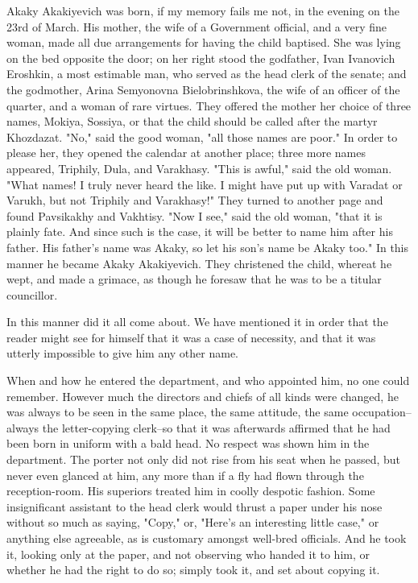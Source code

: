 Akaky Akakiyevich was born, if my memory fails me not, in the evening
on the 23rd of March. His mother, the wife of a Government official,
and a very fine woman, made all due arrangements for having the child
baptised. She was lying on the bed opposite the door; on her right
stood the godfather, Ivan Ivanovich Eroshkin, a most estimable man,
who served as the head clerk of the senate; and the godmother, Arina
Semyonovna Bielobrinshkova, the wife of an officer of the quarter, and
a woman of rare virtues. They offered the mother her choice of three
names, Mokiya, Sossiya, or that the child should be called after the
martyr Khozdazat. "No," said the good woman, "all those names are
poor." In order to please her, they opened the calendar at another
place; three more names appeared, Triphily, Dula, and Varakhasy. "This
is awful," said the old woman. "What names! I truly never heard the
like. I might have put up with Varadat or Varukh, but not Triphily and
Varakhasy!" They turned to another page and found Pavsikakhy and
Vakhtisy. "Now I see," said the old woman, "that it is plainly fate.
And since such is the case, it will be better to name him after his
father. His father's name was Akaky, so let his son's name be Akaky
too." In this manner he became Akaky Akakiyevich. They christened the
child, whereat he wept, and made a grimace, as though he foresaw that
he was to be a titular councillor.

In this manner did it all come about. We have mentioned it in order
that the reader might see for himself that it was a case of necessity,
and that it was utterly impossible to give him any other name.

When and how he entered the department, and who appointed him, no one
could remember. However much the directors and chiefs of all kinds
were changed, he was always to be seen in the same place, the same
attitude, the same occupation--always the letter-copying clerk--so
that it was afterwards affirmed that he had been born in uniform with
a bald head. No respect was shown him in the department. The porter
not only did not rise from his seat when he passed, but never even
glanced at him, any more than if a fly had flown through the
reception-room. His superiors treated him in coolly despotic fashion.
Some insignificant assistant to the head clerk would thrust a paper
under his nose without so much as saying, "Copy," or, "Here's an
interesting little case," or anything else agreeable, as is customary
amongst well-bred officials. And he took it, looking only at the
paper, and not observing who handed it to him, or whether he had the
right to do so; simply took it, and set about copying it.

